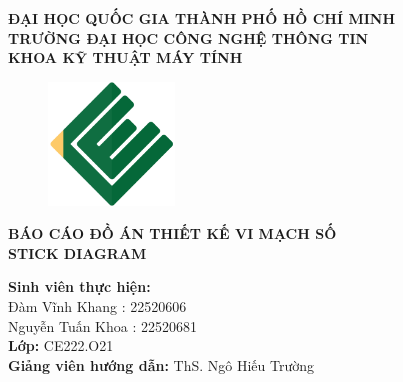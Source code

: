 \documentclass[a4paper,12pt]{article}
\begin{document}

\begin{center}
\textbf{ĐẠI HỌC QUỐC GIA THÀNH PHỐ HỒ CHÍ MINH}\\
\textbf{TRƯỜNG ĐẠI HỌC CÔNG NGHỆ THÔNG TIN}\\
\textbf{KHOA KỸ THUẬT MÁY TÍNH}\\[1cm]

\begin{figure}[H]
    \centering
    \includegraphics[width=0.3\textwidth]{../PNG/CE.png}
    \label{fig:LOGO_CE}\\
\end{figure}



\textbf{\Large BÁO CÁO ĐỒ ÁN THIẾT KẾ VI MẠCH SỐ}\\
\textbf{\Large STICK DIAGRAM}\\[2cm]

\begin{flushleft}
\textbf{Sinh viên thực hiện:} \\
Đàm Vĩnh Khang : 22520606 \\
Nguyễn Tuấn Khoa : 22520681\\[0.5cm]

\textbf{Lớp:} CE222.O21\\
\textbf{Giảng viên hướng dẫn:} ThS. Ngô Hiếu Trường\\[1cm]

\end{flushleft}
\end{center}

\newpage

\tableofcontents
\newpage

\end{document}
